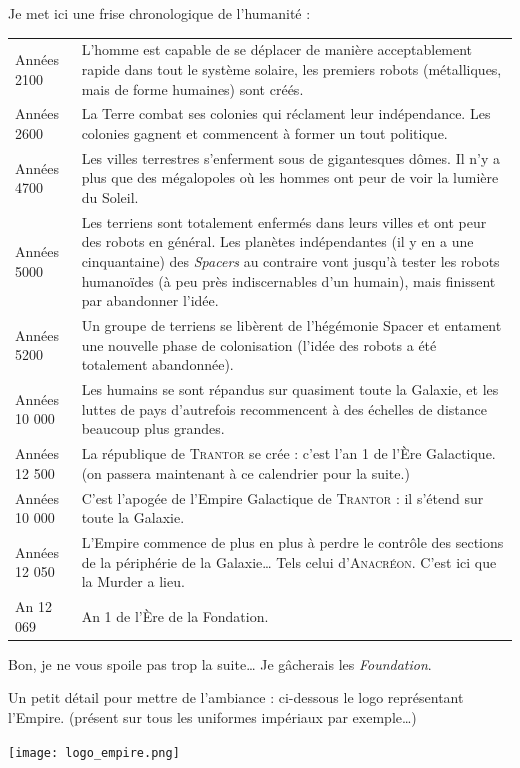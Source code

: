 \documentclass{article}
\begin{document}
Je met ici une frise chronologique de l’humanité : \\
\begin{tabular}{@{}p{\annee}p{\texte}@{}}
Années 2100 & L’homme est capable de se déplacer de manière acceptablement rapide dans tout le système solaire, les premiers robots (métalliques, mais de forme humaines) sont créés. \\
Années 2600 & La Terre combat ses colonies qui réclament leur indépendance. Les colonies gagnent et commencent à former un tout politique. \\
Années 4700 & Les villes terrestres s'enferment sous de gigantesques dômes. Il n’y a plus que des mégalopoles où les hommes ont peur de voir la lumière du Soleil. \\
Années 5000 & Les terriens sont totalement enfermés dans leurs villes et ont peur des robots en général. Les planètes indépendantes (il y en a une cinquantaine) des \textit{Spacers} au contraire vont jusqu'à tester les robots humanoïdes (à peu près indiscernables d’un humain), mais finissent par abandonner l’idée. \\
Années 5200 & Un groupe de terriens se libèrent de l'hégémonie Spacer et entament une nouvelle phase de colonisation (l’idée des robots a été totalement abandonnée). \\
Années 10 000 & Les humains se sont répandus sur quasiment toute la Galaxie, et les luttes de pays d’autrefois recommencent à des échelles de distance beaucoup plus grandes. \\
Années 12 500 & La république de \textsc{Trantor} se crée : c’est l’an 1 de l’Ère Galactique. (on passera maintenant à ce calendrier pour la suite.) \\
Années 10 000 & C’est l’apogée de l’Empire Galactique de \textsc{Trantor} : il s’étend sur toute la Galaxie. \\
Années 12 050 & L’Empire commence de plus en plus à perdre le contrôle des sections de la périphérie de la Galaxie… Tels celui d’\textsc{Anacréon}. C’est ici que la Murder a lieu. \\
An 12 069 & An 1 de l’Ère de la Fondation. \\
\end{tabular}
Bon, je ne vous spoile pas trop la suite… Je gâcherais les \textit{Foundation}.

Un petit détail pour mettre de l’ambiance :
ci-dessous le logo représentant l’Empire. (présent sur tous les uniformes impériaux par exemple…)

\begin{center}
	\texttt{[image: logo\_empire.png]}
\end{center}
\end{document}
